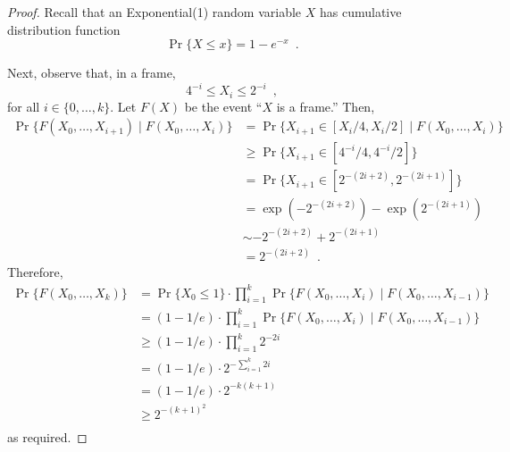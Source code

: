 \documentclass{patmorin}
\begin{document}
\begin{proof}
Recall that an Exponential(1) random variable $X$ has cumulative
distribution function
\[
   \Pr\{X \le x\} = 1-e^{-x} \enspace .
\]

Next, observe that, in a frame,
\[
                 4^{-i} \le X_i \le 2^{-i}  \enspace ,
\]
for all $i\in\{0,\ldots,k\}$.  Let $F(X)$ be the event ``$X$ is a frame.''
Then,
\begin{align*}
     \Pr\{F(X_0,\ldots,X_{i+1}) \mid F(X_0,\ldots,X_{i})\} 
        & = \Pr\{X_{i+1} \in [X_{i}/4,X_{i}/2] \mid F(X_0,\ldots,X_{i})\} \\
        & \ge \Pr\{X_{i+1} \in [4^{-i}/4,4^{-i}/2]\} \\
        & = \Pr\{X_{i+1} \in [2^{-(2i+2)},2^{-(2i+1)}]\} \\
        & = \exp(-2^{-(2i+2)}) - \exp(2^{-(2i+1)}) \\
        & \sim -2^{-(2i+2)} + 2^{-(2i+1)} \\
        & = 2^{-(2i+2)} \enspace .
\end{align*}
Therefore,
\begin{align*}
     \Pr\{F(X_0,\ldots,X_{k})\}
   & = \Pr\{X_0\le 1\}
         \cdot\prod_{i=1}^k \Pr\{F(X_0,\ldots,X_{i})
                                 \mid F(X_0,\ldots,X_{i-1})\} \\
   & = (1-1/e)
         \cdot\prod_{i=1}^k \Pr\{F(X_0,\ldots,X_{i})
                                 \mid F(X_0,\ldots,X_{i-1})\} \\
   & \ge (1-1/e)\cdot\prod_{i=1}^k 2^{-2i} \\
   & = (1-1/e)\cdot2^{-\sum_{i=1}^k 2i} \\
   & = (1-1/e)\cdot2^{-k(k+1)} \\
   & \ge 2^{-(k+1)^2} \\
\end{align*}
as required.
\end{proof}

%
%
\end{document}
